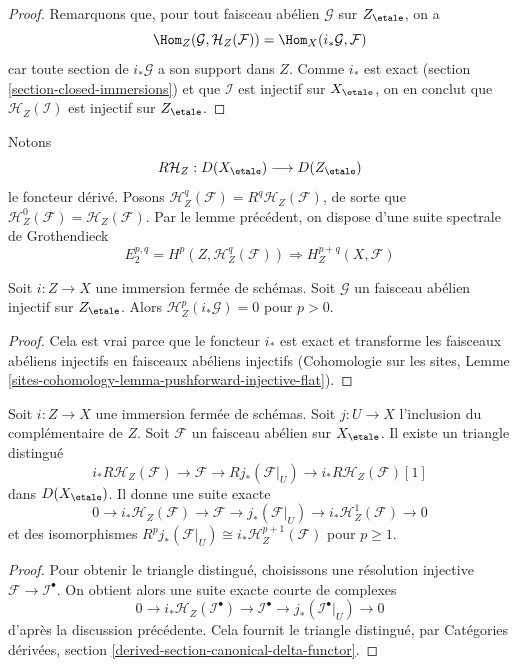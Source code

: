 \begin{proof}
Remarquons que, pour tout faisceau abélien $\mathcal{G}$ sur $Z_\etale$,
on a
$$
\Hom_Z(\mathcal{G}, \mathcal{H}_Z(\mathcal{F})) =
\Hom_X(i_*\mathcal{G}, \mathcal{F})
$$
car toute section de $i_*\mathcal{G}$ a son support dans $Z$.
Comme $i_*$ est exact (section \ref{section-closed-immersions}) et que
$\mathcal{I}$ est injectif sur $X_\etale$, on en conclut que
$\mathcal{H}_Z(\mathcal{I})$ est injectif sur $Z_\etale$.
\end{proof}

\noindent
Notons
$$
R\mathcal{H}_Z : D(X_\etale) \longrightarrow D(Z_\etale)
$$
le foncteur dérivé. Posons
$\mathcal{H}^q_Z(\mathcal{F}) = R^q\mathcal{H}_Z(\mathcal{F})$, de sorte que
$\mathcal{H}^0_Z(\mathcal{F}) = \mathcal{H}_Z(\mathcal{F})$.
Par le lemme précédent, on dispose d'une suite spectrale de Grothendieck
$$
E_2^{p, q} = H^p(Z, \mathcal{H}^q_Z(\mathcal{F}))
\Rightarrow H^{p + q}_Z(X, \mathcal{F})
$$

\begin{lemma}
\label{lemma-cohomology-with-support-sheaf-on-support}
Soit $i : Z \to X$ une immersion fermée de schémas.
Soit $\mathcal{G}$ un faisceau abélien injectif sur $Z_\etale$.
Alors $\mathcal{H}^p_Z(i_*\mathcal{G}) = 0$ pour $p > 0$.
\end{lemma}

\begin{proof}
Cela est vrai parce que le foncteur $i_*$ est exact et transforme
les faisceaux abéliens injectifs en faisceaux abéliens injectifs
(Cohomologie sur les sites, Lemme
\ref{sites-cohomology-lemma-pushforward-injective-flat}).
\end{proof}

\begin{lemma}
\label{lemma-cohomology-with-support-triangle}
Soit $i : Z \to X$ une immersion fermée de schémas.
Soit $j : U \to X$ l'inclusion du complémentaire de $Z$.
Soit $\mathcal{F}$ un faisceau abélien sur $X_\etale$.
Il existe un triangle distingué
$$
i_*R\mathcal{H}_Z(\mathcal{F}) \to \mathcal{F} \to Rj_*(\mathcal{F}|_U) \to
i_*R\mathcal{H}_Z(\mathcal{F})[1]
$$
dans $D(X_\etale)$. Il donne une suite exacte
$$
0 \to i_*\mathcal{H}_Z(\mathcal{F}) \to \mathcal{F} \to
j_*(\mathcal{F}|_U) \to i_*\mathcal{H}^1_Z(\mathcal{F}) \to 0
$$
et des isomorphismes
$R^pj_*(\mathcal{F}|_U) \cong i_*\mathcal{H}^{p + 1}_Z(\mathcal{F})$
pour $p \geq 1$.
\end{lemma}

\begin{proof}
Pour obtenir le triangle distingué, choisissons une résolution injective
$\mathcal{F} \to \mathcal{I}^\bullet$. On obtient alors une suite exacte courte
de complexes
$$
0 \to
i_*\mathcal{H}_Z(\mathcal{I}^\bullet) \to \mathcal{I}^\bullet
\to j_*(\mathcal{I}^\bullet|_U) \to 0
$$
d'après la discussion précédente. Cela fournit le triangle distingué, par
Catégories dérivées, section \ref{derived-section-canonical-delta-functor}.
\end{proof}

